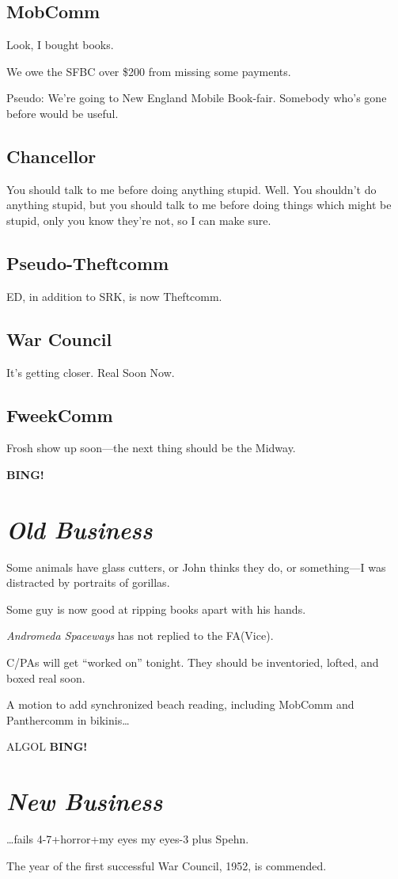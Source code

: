 \documentclass[10pt]{article}
\newcommand{\bing}{{\bf BING!} }
\newcommand{\goto}[1]{\bing \vskip 12pt \section*{{\em{#1}}}}
\newcommand{\ps}{ plus Spehn\xspace}
\begin{document}
\subsection*{MobComm}
Look, I bought books.

We owe the SFBC over \$200 from missing some payments.

Pseudo: We're going to New England Mobile Book-fair.  Somebody who's
gone before would be useful.

\subsection*{Chancellor}
You should talk to me before doing anything stupid.  Well.  You
shouldn't do anything stupid, but you should talk to me before doing
things which might be stupid, only you know they're not, so I can make
sure.


\subsection*{Pseudo-Theftcomm}
ED, in addition to SRK, is now Theftcomm.

\subsection*{War Council}
It's getting closer.  Real Soon Now.

\subsection*{FweekComm}
Frosh show up soon---the next thing should be the Midway.

\goto{Old Business}
Some animals have glass cutters, or John thinks they do, or
something---I was distracted by portraits of gorillas.

Some guy is now good at ripping books apart with his hands.  

\emph{Andromeda Spaceways} has not replied to the FA(Vice).

C/PAs will get ``worked on'' tonight.  They should be inventoried,
lofted, and boxed real soon.

A motion to add synchronized beach reading, including MobComm and
Panthercomm in bikinis\dots

ALGOL
\goto{New Business}

\dots fails 4-7+horror+my eyes my eyes-3\ps.

The year of the first successful War Council, 1952, is commended.
\end{document}
